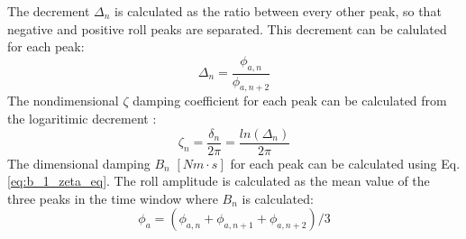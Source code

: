 The decrement $\Delta_n$ is calculated as the ratio between every
other peak, so that negative and positive roll peaks are separated. This
decrement can be calulated for each peak:
\begin{equation}
\Delta_n = \frac{\phi_{a,n}}{\phi_{a,n+2}}
\label{decrement}
\end{equation}
The nondimensional $\zeta$ damping coefficient for each peak can be
calculated from the logaritimic decrement \citep{7505983/BYNJ8CFG}:
\begin{equation}
\zeta_n = \frac{\delta_n}{2\pi}=\frac{ln(\Delta_n)}{2\pi}
\label{zeta_n}
\end{equation}
The dimensional damping $B_n$ $[Nm \cdot s]$ for each peak can be
calculated using Eq.\ref{eq:b_1_zeta_eq}.
The roll amplitude is calculated as the mean value of the three peaks in
the time window where $B_n$ is calculated:
\begin{equation}
\phi_a = (\phi_{a,n} + \phi_{a,n+1} + \phi_{a,n+2})/3
\label{phi_a}
\end{equation}
